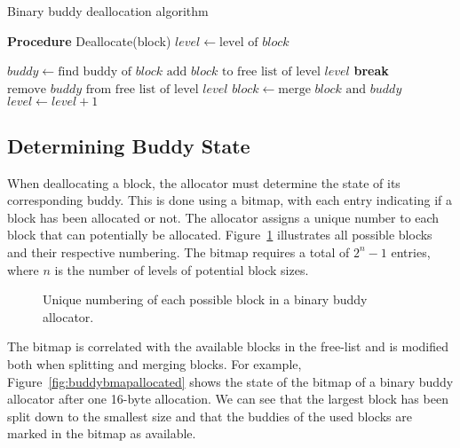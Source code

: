 \begin{algorithm}[h]
    \caption{Binary buddy deallocation algorithm}
    \label{alg:bbuddy_dealloc}
    \begin{algorithmic}[1]
        \Statex \textbf{Procedure} Deallocate(block)
        \State $level \gets \text{level of } block$

        \State $buddy \gets \text{find buddy of } block$
        \State $\text{add } block \text{ to free list of level } level$
        \State \textbf{break}
        \Else
        \State $\text{remove } buddy \text{ from free list of level } level$
        \State $block \gets \text{merge } block \text{ and } buddy$
        \State $level \gets level + 1$
        \EndIf
        \EndWhile
    \end{algorithmic}
\end{algorithm}

\FloatBarrier
\subsection{Determining Buddy State}
When deallocating a block, the allocator must determine the state of its corresponding buddy. This is done using a bitmap, with each entry indicating if a block has been allocated or not. The allocator assigns a unique number to each block that can potentially be allocated. Figure~\ref{fig:buddyorder} illustrates all possible blocks and their respective numbering. The bitmap requires a total of $2^n - 1$ entries, where $n$ is the number of levels of potential block sizes.

\begin{figure}[h]
    \centering
    
    \caption{Unique numbering of each possible block in a binary buddy allocator.}
    \label{fig:buddyorder}
\end{figure}
The bitmap is correlated with the available blocks in the free-list and is modified both when splitting and merging blocks. For example, Figure~\ref{fig:buddybmapallocated} shows the state of the bitmap of a binary buddy allocator after one 16-byte allocation. We can see that the largest block has been split down to the smallest size and that the buddies of the used blocks are marked in the bitmap as available.


